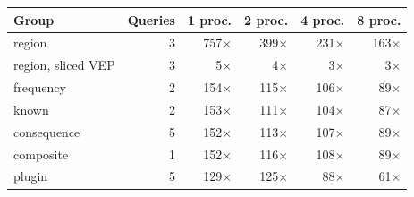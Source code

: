 \begin{tabular}{lrrrrr}
\toprule
Group & Queries & 1 proc. & 2 proc. & 4 proc. & 8 proc. \\
\midrule
region & 3 & 757$\times$ & 399$\times$ & 231$\times$ & 163$\times$ \\
region, sliced VEP & 3 & 5$\times$ & 4$\times$ & 3$\times$ & 3$\times$ \\
frequency & 2 & 154$\times$ & 115$\times$ & 106$\times$ & 89$\times$ \\
known & 2 & 153$\times$ & 111$\times$ & 104$\times$ & 87$\times$ \\
consequence & 5 & 152$\times$ & 113$\times$ & 107$\times$ & 89$\times$ \\
composite & 1 & 152$\times$ & 116$\times$ & 108$\times$ & 89$\times$ \\
plugin & 5 & 129$\times$ & 125$\times$ & 88$\times$ & 61$\times$ \\
\bottomrule
\end{tabular}
